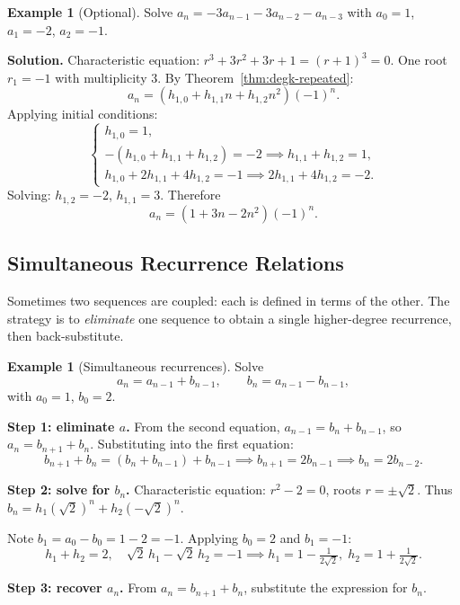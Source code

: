 \documentclass[11pt, a4paper, notitlepage]{report}
\theoremstyle{definition}
\newtheorem{example}[theorem]{Example}
\theoremstyle{remark}
\begin{document}
\begin{example}[Optional]
\label{ex:triple-root}
Solve $a_n = -3a_{n-1} - 3a_{n-2} - a_{n-3}$ with $a_0 = 1$, $a_1 = -2$, $a_2 = -1$.

\textbf{Solution.}  Characteristic equation: $r^3 + 3r^2 + 3r + 1 = (r+1)^3 = 0$.
One root $r_1 = -1$ with multiplicity $3$.  By Theorem~\ref{thm:degk-repeated}:
\[
  a_n = (h_{1,0} + h_{1,1} n + h_{1,2} n^2)(-1)^n.
\]
Applying initial conditions:
\[
  \begin{cases} h_{1,0} = 1, \\ -(h_{1,0} + h_{1,1} + h_{1,2}) = -2 \implies h_{1,1} + h_{1,2} = 1, \\ h_{1,0} + 2h_{1,1} + 4h_{1,2} = -1 \implies 2h_{1,1} + 4h_{1,2} = -2. \end{cases}
\]
Solving: $h_{1,2} = -2$, $h_{1,1} = 3$.  Therefore
\[
  \boxed{a_n = (1 + 3n - 2n^2)(-1)^n.}
\]
\end{example}

\subsection{Simultaneous Recurrence Relations}
\label{subsec:simultaneous}

Sometimes two sequences are coupled: each is defined in terms of the other.  The strategy
is to \emph{eliminate} one sequence to obtain a single higher-degree recurrence, then
back-substitute.

\begin{example}[Simultaneous recurrences]
\label{ex:simultaneous}
Solve
\[
  a_n = a_{n-1} + b_{n-1}, \qquad b_n = a_{n-1} - b_{n-1},
\]
with $a_0 = 1$, $b_0 = 2$.

\textbf{Step 1: eliminate $a$.}  From the second equation, $a_{n-1} = b_n + b_{n-1}$, so
$a_n = b_{n+1} + b_n$.  Substituting into the first equation:
\[
  b_{n+1} + b_n = (b_n + b_{n-1}) + b_{n-1}
  \implies b_{n+1} = 2b_{n-1}
  \implies b_n = 2b_{n-2}.
\]

\textbf{Step 2: solve for $b_n$.}  Characteristic equation: $r^2 - 2 = 0$, roots
$r = \pm\sqrt{2}$.  Thus $b_n = h_1(\sqrt{2})^n + h_2(-\sqrt{2})^n$.

Note $b_1 = a_0 - b_0 = 1 - 2 = -1$.  Applying $b_0 = 2$ and $b_1 = -1$:
\[
  h_1 + h_2 = 2, \quad \sqrt{2}\,h_1 - \sqrt{2}\,h_2 = -1
  \implies h_1 = 1 - \tfrac{1}{2\sqrt{2}},\; h_2 = 1 + \tfrac{1}{2\sqrt{2}}.
\]

\textbf{Step 3: recover $a_n$.}  From $a_n = b_{n+1} + b_n$, substitute the expression
for $b_n$.
\end{example}
\end{document}
